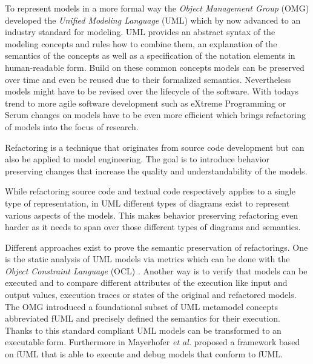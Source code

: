 \documentclass{llncs}
\begin{document}

To represent models in a more formal way the \textit{Object Management Group} (OMG) developed the \textit{Unified Modeling Language} (UML) 
\cite{man:UML} which by now advanced to an industry standard for 
modeling. UML provides an abstract syntax of the modeling concepts and rules how to combine them, an explanation 
of the semantics of the concepts as well as a specification of the notation elements in human-readable form.
Build on these common concepts models can be preserved over time and even be reused due to their formalized semantics. Nevertheless models 
might have to be revised over the lifecycle of the software. With todays trend to more agile software 
development such as eXtreme Programming \cite{DBLP:journals/computer/Beck99} or Scrum \cite{DBLP:journals/software/RisingJ00} 
changes on models have to be even more efficient which brings refactoring of models into the focus of research.


Refactoring is a technique that originates from source code development but can also be applied to model engineering.
The goal is to introduce behavior preserving changes \cite{mast:REFOOF} that increase the quality and understandability
of the models.


While refactoring source code and textual code respectively applies to a single type of representation, in UML different
types of diagrams exist to represent various aspects of the models. This makes behavior preserving refactoring even harder 
as it needs to span over those different types of diagrams and semantics.


Different approaches exist to prove the semantic preservation of refactorings. One is the static analysis of
UML models via metrics which can be done with
the \textit{Object Constraint Language} (OCL) \cite{man:OCL}. Another way is to verify that models can be executed and to compare 
different attributes of the execution like input and output values, execution traces or states of the 
original and refactored models. The OMG introduced a foundational subset 
of UML metamodel concepts abbreviated fUML \cite{man:FUML} and precisely defined the semantics for their execution. Thanks 
to this standard compliant UML models can be transformed to an executable form. 
Furthermore in \cite{DBLP:conf/icse/Mayerhofer12} Mayerhofer \textit{et al.} proposed a framework based on fUML that is able to execute
and debug models that conform to fUML.
\end{document}
